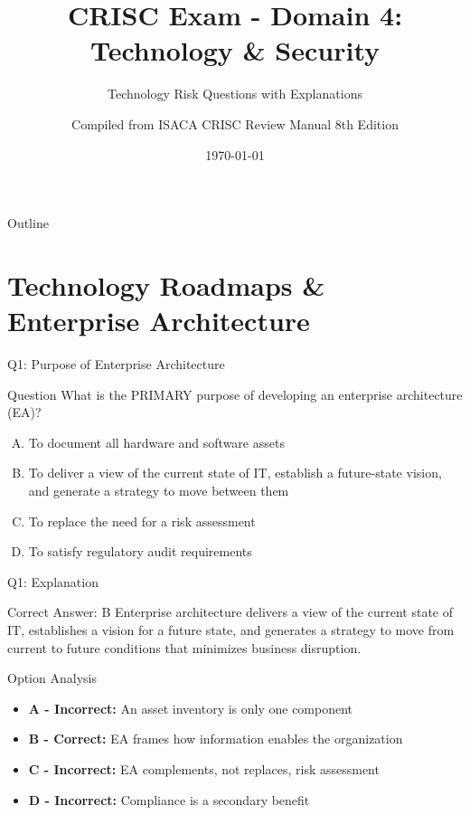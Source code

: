 \documentclass{beamer}
\title{CRISC Exam - Domain 4: Technology \& Security}
\subtitle{Technology Risk Questions with Explanations}
\author{Compiled from ISACA CRISC Review Manual 8th Edition}
\date{\today}
\begin{document}
	
	\begin{frame}
		\titlepage
	\end{frame}
	
	\begin{frame}{Outline}
		\tableofcontents
	\end{frame}
	
	
	\section{Technology Roadmaps \& Enterprise Architecture}
	
	\begin{frame}{Q1: Purpose of Enterprise Architecture}
		\begin{block}{Question}
			What is the PRIMARY purpose of developing an enterprise architecture (EA)?
		\end{block}
		\begin{enumerate}[(A)]
			\item To document all hardware and software assets
			\item To deliver a view of the current state of IT, establish a future-state vision, and generate a strategy to move between them
			\item To replace the need for a risk assessment
			\item To satisfy regulatory audit requirements
		\end{enumerate}
	\end{frame}
	
	\begin{frame}{Q1: Explanation}
		\begin{block}{Correct Answer: B}
			Enterprise architecture delivers a view of the current state of IT, establishes a vision for a future state, and generates a strategy to move from current to future conditions that minimizes business disruption.
		\end{block}
		\begin{block}{Option Analysis}
			\begin{itemize}
				\item \textbf{A - Incorrect:} An asset inventory is only one component
				\item \textbf{B - Correct:} EA frames how information enables the organization
				\item \textbf{C - Incorrect:} EA complements, not replaces, risk assessment
				\item \textbf{D - Incorrect:} Compliance is a secondary benefit
			\end{itemize}
		\end{block}
	\end{frame}
	
\end{document}
